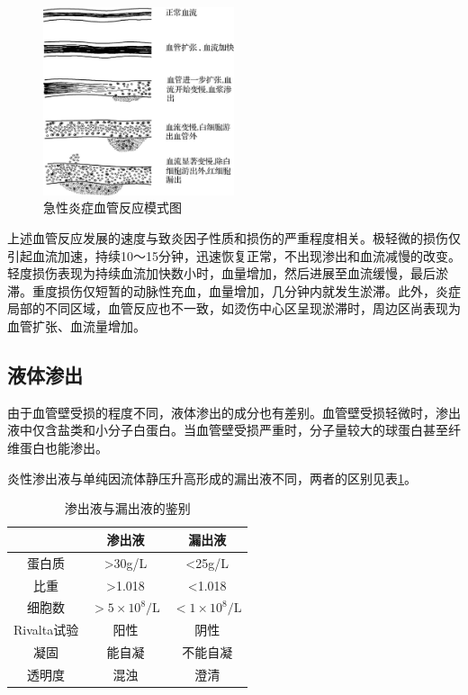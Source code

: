 \begin{figure}[!htbp]
  \centering
  \includegraphics[width=0.5\textwidth]{./images/Image00050.jpg}
  \caption{急性炎症血管反应模式图}
  \label{fig4-1}
\end{figure}

上述血管反应发展的速度与致炎因子性质和损伤的严重程度相关。极轻微的损伤仅引起血流加速，持续10～15分钟，迅速恢复正常，不出现渗出和血流减慢的改变。轻度损伤表现为持续血流加快数小时，血量增加，然后进展至血流缓慢，最后淤滞。重度损伤仅短暂的动脉性充血，血量增加，几分钟内就发生淤滞。此外，炎症局部的不同区域，血管反应也不一致，如烫伤中心区呈现淤滞时，周边区尚表现为血管扩张、血流量增加。

\subsection{液体渗出}

由于血管壁受损的程度不同，液体渗出的成分也有差别。血管壁受损轻微时，渗出液中仅含盐类和小分子白蛋白。当血管壁受损严重时，分子量较大的球蛋白甚至纤维蛋白也能渗出。

炎性渗出液与单纯因流体静压升高形成的漏出液不同，两者的区别见表\ref{tab4-1}。


\begin{table}
  \centering
  \caption{渗出液与漏出液的鉴别}
  \label{tab4-1}
  \begin{tabular}{ccc}
    \toprule
                & 渗出液                   & 漏出液   \\
    \midrule
    蛋白质      & >30g/L                   & <25g/L   \\
    比重        & >1.018                   & <1.018   \\
    细胞数      & $>5\times 10^8/\text{L}$ &
    $<1\times 10^8/\text{L}$                          \\
    Rivalta试验 & 阳性                     & 阴性     \\
    凝固        & 能自凝                   & 不能自凝 \\
    透明度      & 混浊                     & 澄清     \\
    \bottomrule
  \end{tabular}
\end{table}

